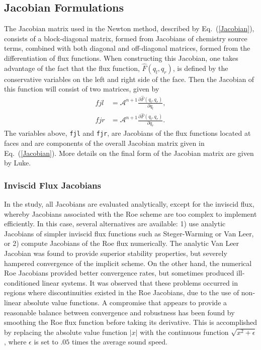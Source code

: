\subsection{Jacobian Formulations}

The Jacobian matrix used in the Newton method, described by
Eq.~(\ref{Jacobian}), consists of a block-diagonal matrix, formed from
Jacobians of chemistry source terms, combined with both diagonal and
off-diagonal matrices, formed from the differentiation of flux functions.
When constructing this Jacobian, one takes advantage of the fact that
the flux function, $\hat{F}(q_{l}, q_{r})$,
is defined by the conservative variables on the left and
right side of the face.  Then the Jacobian of this function will
consist of two matrices, given by
\begin{equation}
\begin{split}
fjl & = \mathcal{A}^{n+1}\frac{\partial \hat{F}(q_{l},q_{r})}{\partial q_{l}},\\
fjr & = \mathcal{A}^{n+1}\frac{\partial \hat{F}(q_{l},q_{r})}{\partial q_{r}}.
\end{split}
\end{equation}
The variables above, {\tt fjl} and {\tt fjr}, are Jacobians of the flux
functions located at faces and are components of the overall Jacobian
matrix given in Eq.~(\ref{Jacobian}).
More details on the final form of the Jacobian matrix are given by 
Luke\cite{luke.99}.

\subsubsection{Inviscid Flux Jacobians}

In the study, all Jacobians are evaluated analytically, except for the
inviscid flux, whereby Jacobians associated with the Roe scheme are
too complex to implement efficiently.  In this case, several
alternatives are available: 1) use analytic Jacobians of simpler
inviscid flux functions such as Steger-Warming or Van Leer, or 2)
compute Jacobians of the Roe flux numerically. The
analytic Van Leer Jacobian was found to provide superior stability properties,
but severely hampered convergence of the implicit scheme.  On the
other hand, the numerical Roe Jacobians provided better convergence
rates, but sometimes produced ill-conditioned linear systems.  It was
observed that these problems occurred in regions where discontinuities
existed in the Roe Jacobians, due to the use of non-linear absolute
value functions.  A compromise that appears to provide a reasonable
balance between convergence and robustness has been found by smoothing
the Roe flux function before taking its derivative.  This is
accomplished by replacing the absolute value function $|x|$ with the continuous
function $\sqrt{x^2+\epsilon}$, where $\epsilon$ is set to $.05$ times
the average sound speed.

